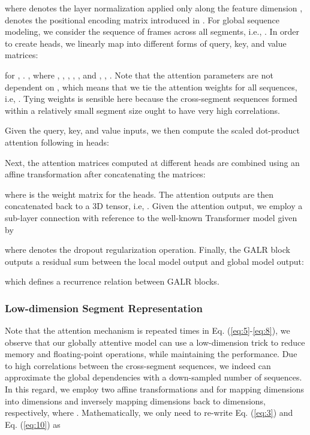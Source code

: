 \documentclass{article}
\begin{document}
where  denotes the layer normalization applied only along the feature dimension ,  denotes the positional encoding matrix introduced in \cite{vaswani2017attention}. For global sequence modeling, we consider the sequence of frames across all segments, i.e.,  . In order to create  heads, we linearly map  into  different forms of query, key, and value matrices:

for , .
, where , , , , ,  and , , .
Note that the attention parameters are not dependent on , which means that we tie the attention weights for all  sequences, i.e, . Tying weights is sensible here because the cross-segment sequences formed within a relatively small segment size ought to have very high correlations. 

Given the query, key, and value inputs, we then compute the scaled dot-product attention following \cite{vaswani2017attention} in  heads:



Next, the attention matrices computed at different heads are combined using an affine transformation after concatenating the matrices:

where  is the weight matrix for the heads. The attention outputs are then concatenated back to a 3D tensor, i.e,
. Given the attention output, we employ a sub-layer connection with reference to the well-known Transformer model \cite{vaswani2017attention} given by

where  denotes the dropout regularization \cite{srivastava2014dropout} operation. Finally, the GALR block outputs a residual sum between the local model output and global model output:

which defines a recurrence relation between  GALR blocks.

\subsubsection{Low-dimension Segment Representation}
Note that the attention mechanism is repeated  times in Eq. (\ref{eq:5}-\ref{eq:8}), we observe that our globally attentive model can use a low-dimension trick to reduce memory and floating-point operations, while maintaining the performance. Due to high correlations between the cross-segment sequences, we indeed can approximate the global dependencies with a down-sampled number of sequences. In this regard, we employ two affine transformations  and  for mapping  dimensions into  dimensions and inversely mapping  dimensions back to  dimensions, respectively, where . Mathematically, we only need to re-write Eq. (\ref{eq:3}) and Eq. (\ref{eq:10}) as
\end{document}
